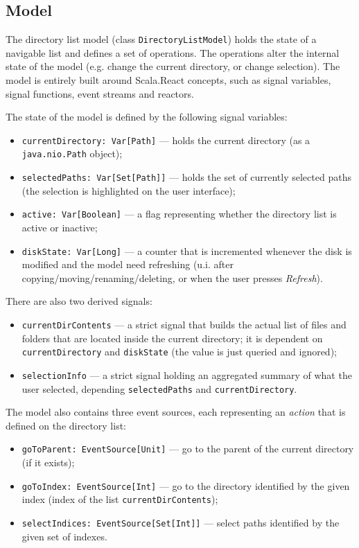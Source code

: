 \subsection{Model}

The directory list model (class \texttt{DirectoryListModel}) holds the state of a navigable list and defines a set of operations. The operations alter the internal state of the model (e.g. change the current directory, or change selection). The model is entirely built around Scala.React concepts, such as signal variables, signal functions, event streams and reactors.

The state of the model is defined by the following signal variables:
\begin{itemize}
\item \texttt{currentDirectory: Var[Path]} --- holds the current directory (as a \texttt{java.nio.Path} object);
\item \texttt{selectedPaths: Var[Set[Path]]} --- holds the set of currently selected paths (the selection is highlighted on the user interface);
\item \texttt{active: Var[Boolean]} --- a flag representing whether the directory list is active or inactive;
\item \texttt{diskState: Var[Long]} --- a counter that is incremented whenever the disk is modified and the model need refreshing (u.i. after copying/moving/renaming/deleting, or when the user presses \emph{Refresh}).
\end{itemize}

There are also two derived signals:
\begin{itemize}

\item \texttt{currentDirContents} --- a strict signal that builds the actual list of files and folders that are located inside the current directory; it is dependent on \texttt{currentDirectory} and \texttt{diskState} (the value is just queried and ignored);

\item \texttt{selectionInfo} --- a strict signal holding an aggregated summary of what the user selected, depending \texttt{selectedPaths} and \texttt{currentDirectory}.
\end{itemize}

The model also contains three event sources, each representing an \emph{action} that is defined on the directory list:
\begin{itemize}
\item \texttt{goToParent: EventSource[Unit]} --- go to the parent of the current directory (if it exists);
\item \texttt{goToIndex: EventSource[Int]} --- go to the directory identified by the given index (index of the list \texttt{currentDirContents});
\item \texttt{selectIndices: EventSource[Set[Int]]} --- select paths identified by the given set of indexes.
\end{itemize}

